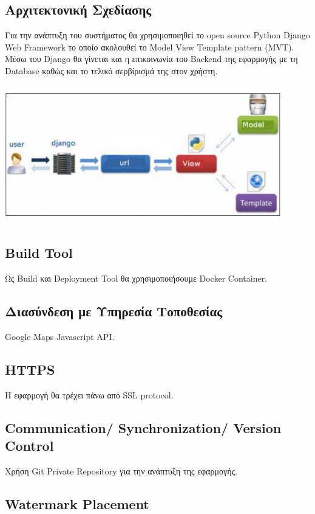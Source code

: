 \documentclass[letterpaper,6pt]{article}
\begin{document}
\subsection{Αρχιτεκτονική Σχεδίασης}

Για την ανάπτυξη του συστήματος θα χρησιμοποιηθεί το open source Python Django Web Framework το οποίο ακολουθεί το Model View Template pattern (MVT). Μέσω του Django θα γίνεται και η επικοινωνία του Βackend της εφαρμογής με τη Database καθώς και το τελικό σερβίρισμά της στον χρήστη.

\includegraphics[width=12cm,height=6cm]{django1.png}\\
\subsection{Build Tool}

Ως Build και Deployment Tool θα χρησιμοποιήσουμε Docker Container.

\subsection{Διασύνδεση με Υπηρεσία Τοποθεσίας}

Google Maps Javascript API.

\subsection{HTTPS}

Η εφαρμογή θα τρέχει πάνω από SSL protocol.

\subsection{Communication/ Synchronization/ Version Control}

Χρήση Git Private Repository για την ανάπτυξη της εφαρμογής. 

\subsection{Watermark Placement}
\end{document}
